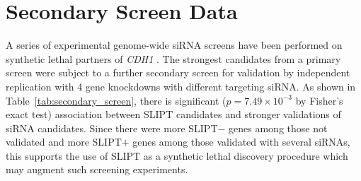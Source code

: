 

\chapter{Secondary Screen Data}
\label{appendix:secondary_screen}

A series of experimental genome-wide siRNA screens have been performed on synthetic lethal partners of \textit{CDH1} \citep{Telford2015}. The strongest candidates from a primary screen were subject to a further secondary screen for validation by independent replication with 4 gene knockdowns with different targeting siRNA. As shown in Table~\ref{tab:secondary_screen}, there is significant ($p=7.49 \times 10^{-3}$ by Fisher's exact test) %
association between SLIPT candidates and stronger validations of siRNA candidates. Since there were more SLIPT$-$ genes among those not validated and more SLIPT$+$ genes among those validated with several siRNAs, this supports the use of SLIPT as a synthetic lethal discovery procedure which may augment such screening experiments.

